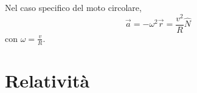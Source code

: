 \documentclass[a4paper]{article}
\begin{document}
Nel caso specifico del moto circolare,
\[
    \vec{a} = -\omega^2\vec{r} = \frac{v^2}{R} \hat{N}
\]
con \(\omega = \frac{v}{R}\).


\pagebreak

\section{Relatività}

\end{document}
